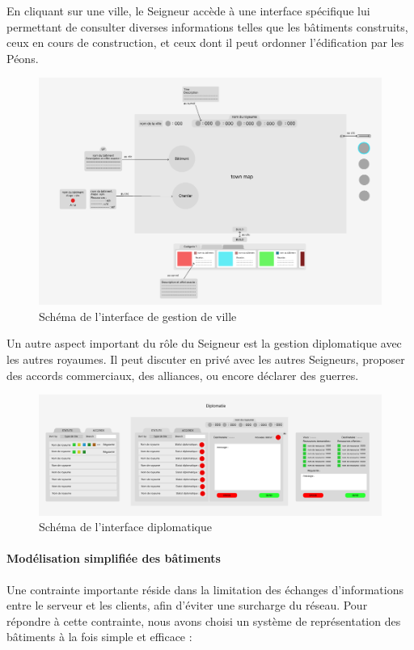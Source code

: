 En cliquant sur une ville, le Seigneur accède à une interface spécifique lui permettant de consulter diverses informations telles que les bâtiments construits, ceux en cours de construction, et ceux dont il peut ordonner l’édification par les Péons.

\begin{figure}[!h]
    \centering
    \includegraphics[width=0.7\linewidth]{images/figma_town.png}
    \caption{Schéma de l'interface de gestion de ville}
    \label{fig:figma-town}
\end{figure}

Un autre aspect important du rôle du Seigneur est la gestion diplomatique avec les autres royaumes. Il peut discuter en privé avec les autres Seigneurs, proposer des accords commerciaux, des alliances, ou encore déclarer des guerres.

\begin{figure}[!h]
    \centering
    \includegraphics[width=0.7\linewidth]{images/figma_diplomatie.png}
    \caption{Schéma de l'interface diplomatique}
    \label{fig:figma-diplomacy}
\end{figure}

\newpage

\paragraph{Modélisation simplifiée des bâtiments}

Une contrainte importante réside dans la limitation des échanges d’informations entre le serveur et les clients, afin d’éviter une surcharge du réseau. Pour répondre à cette contrainte, nous avons choisi un système de représentation des bâtiments à la fois simple et efficace :

